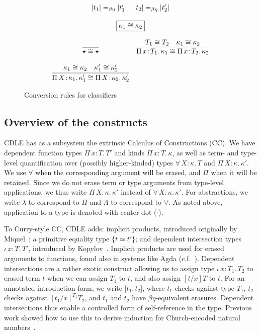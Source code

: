 \documentclass{article}
\newcommand{\abs}[4]{{#1}\, #2\! : \! #3.\, #4}
\begin{document}
\begin{figure}
\[\begin{array}{c}
\begin{array}{cc}
{         |t_1| =_{\beta\eta} |t_1'| \quad |t_2| =_{\beta\eta} |t_2'|
        }
      \end{array}
      \\ \\ \fbox{\(\kappa_1 \cong \kappa_2\)}
      \\ \\
      \begin{array}{cc}
        \infer{
         \star \cong \star
        }{}
        & \infer{
           \abs{\Pi}{x}{T_1}{\kappa_1} \cong \abs{\Pi}{x}{T_2}{\kappa_2}
          }{
           T_1 \cong T_2
           \quad \kappa_1 \cong \kappa_2
          }
        \\ \\
        \infer{
         \abs{\Pi}{X}{\kappa_1}{\kappa_1'} \cong \abs{\Pi}{X}{\kappa_2}{\kappa_2'}
        }{
         \kappa_1 \cong \kappa_2
         \quad \kappa_1' \cong \kappa_2'
        }
      \end{array}
    \end{array}
  \]
  \caption{Conversion rules for classifiers}
  \label{fig:conv}
\end{figure}  

\subsection{Overview of the constructs}
\label{sec:overview}

CDLE has as a subsystem the extrinsic Calculus of
Constructions (CC).  We have dependent function types
$\abs{\Pi}{x}{T}{T'}$ and kinds $\abs{\Pi}{x}{T}{\kappa}$, as well as
term- and type-level quantification over (possibly higher-kinded)
types $\abs{\forall}{X}{\kappa}{T}$ and
$\abs{\Pi}{X}{\kappa}{\kappa'}$.  We use $\forall$ when the
corresponding argument will be erased, and $\Pi$ when it will be
retained.  Since we do not erase term or type arguments from
type-level applications, we thus write $\abs{\Pi}{X}{\kappa}{\kappa'}$
instead of $\abs{\forall}{X}{\kappa}{\kappa'}$.
For abstractions, we write $\lambda$ to
correspond to $\Pi$ and $\Lambda$ to correspond to $\forall$.  As noted
above, application to a type is denoted with center dot ($\cdot$).

To Curry-style CC, CDLE adds: implicit products, introduced originally
by Miquel~\cite{miquel01}; a primitive equality type $\{ t \simeq
t'\}$; and dependent intersection types $\abs{\iota}{x}{T}{T'}$,
introduced by Kopylov~\cite{kopylov03}.  Implicit products are used
for erased arguments to functions, found also in systems like Agda
(c.f.~\cite{mishraLinger08}).  Dependent intersections are a rather
exotic construct allowing us to assign type $\abs{\iota}{x}{T_1}{T_2}$ to
erased term $t$ when we can assign $T_1$ to $t$, and also assign
$[t/x]T$ to $t$.  For an annotated introduction form, we write
$[t_1,t_2$], where $t_1$ checks against type $T_1$, $t_2$ checks against
$[t_1/x]^{T_1}T_2$, and $t_1$ and $t_2$ have $\beta\eta$-equivalent
erasures.  Dependent intersections thus enable a controlled form of
self-reference in the type.  Previous work showed how to use this to
derive induction for Church-encoded natural numbers~\cite{stump18}.
\end{document}
